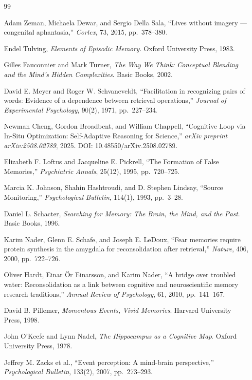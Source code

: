 \documentclass[12pt, a4paper]{article}
\begin{document}
\begin{thebibliography}{99}

Adam Zeman, Michaela Dewar, and Sergio Della Sala,
``Lives without imagery --- congenital aphantasia,''
\textit{Cortex}, 73, 2015, pp.~378--380.

Endel Tulving,
\textit{Elements of Episodic Memory}.
Oxford University Press, 1983.

Gilles Fauconnier and Mark Turner,
\textit{The Way We Think: Conceptual Blending and the Mind's Hidden Complexities}.
Basic Books, 2002.

David E. Meyer and Roger W. Schvaneveldt,
``Facilitation in recognizing pairs of words: Evidence of a dependence between retrieval operations,''
\textit{Journal of Experimental Psychology}, 90(2), 1971, pp.~227--234.

Newman Cheng, Gordon Broadbent, and William Chappell,
``Cognitive Loop via In-Situ Optimization: Self-Adaptive Reasoning for Science,''
\textit{arXiv preprint arXiv:2508.02789}, 2025.
DOI: 10.48550/arXiv.2508.02789.

Elizabeth F. Loftus and Jacqueline E. Pickrell,
``The Formation of False Memories,''
\textit{Psychiatric Annals}, 25(12), 1995, pp.~720--725.

Marcia K. Johnson, Shahin Hashtroudi, and D. Stephen Lindsay,
``Source Monitoring,''
\textit{Psychological Bulletin}, 114(1), 1993, pp.~3--28.

Daniel L. Schacter,
\textit{Searching for Memory: The Brain, the Mind, and the Past}.
Basic Books, 1996.

Karim Nader, Glenn E. Schafe, and Joseph E. LeDoux,
``Fear memories require protein synthesis in the amygdala for reconsolidation after retrieval,''
\textit{Nature}, 406, 2000, pp.~722--726.

Oliver Hardt, Einar \"Or Einarsson, and Karim Nader,
``A bridge over troubled water: Reconsolidation as a link between cognitive and neuroscientific memory research traditions,''
\textit{Annual Review of Psychology}, 61, 2010, pp.~141--167.

David B. Pillemer,
\textit{Momentous Events, Vivid Memories}.
Harvard University Press, 1998.

John O'Keefe and Lynn Nadel,
\textit{The Hippocampus as a Cognitive Map}.
Oxford University Press, 1978.

Jeffrey M. Zacks et al.,
``Event perception: A mind-brain perspective,''
\textit{Psychological Bulletin}, 133(2), 2007, pp.~273--293.

\end{thebibliography}
\end{document}
